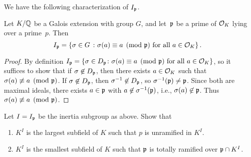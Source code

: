 We have the following characterization of $I_{\mathfrak{p}}$.
\begin{proposition}\label{prop:charip}
  Let $K/\mathbb{Q}$ be a Galois extension with group $G$,
  and let~$\mathfrak{p}$ be a prime of $\mathcal{O}_K$ lying
  over a prime~$p$.  Then
  \[
    I_{\mathfrak{p}} = \left\{
    \sigma\in G \ \colon \sigma(a) \equiv a\pmod{\mathfrak{p}}\text{ for all } a\in\mathcal{O}_K
    \right\}.
  \]
\end{proposition}
\begin{proof}
  By definition $I_{\mathfrak{p}} = \{\sigma\in D_{\mathfrak{p}} \colon \sigma(a) \equiv
  a\pmod{\mathfrak{p}}\text{ for all } a\in\mathcal{O}_K\}$, so it suffices to show that
  if $\sigma\not\in D_{\mathfrak{p}}$, then there exists $a\in\mathcal{O}_K$ such that
  $\sigma(a) \not\equiv a\pmod{\mathfrak{p}}$.  If $\sigma\not\in D_{\mathfrak{p}}$, then
  $\sigma^{-1}\not\in D_{\mathfrak{p}}$, so $\sigma^{-1}(\mathfrak{p})\neq \mathfrak{p}$.  Since both
  are maximal ideals, there exists $a\in\mathfrak{p}$ with
  $a\not\in\sigma^{-1}(\mathfrak{p})$, i.e., $\sigma(a)\not\in\mathfrak{p}$.  Thus
  $\sigma(a) \not\equiv a\pmod{\mathfrak{p}}$.
\end{proof}

\begin{exercise}
  Let $I = I_{\mathfrak{p}}$ be the inertia subgroup as above. Show that
  \begin{enumerate}
    \item $K^I$ is the largest subfield of $K$ such that $p$ is unramified
    in $K^I$.
    \item $K^I$ is the smallest subfield of $K$ such that $\mathfrak{p}$ is totally
    ramified over $\mathfrak{p} \cap K^I$.
  \end{enumerate}
\end{exercise}


